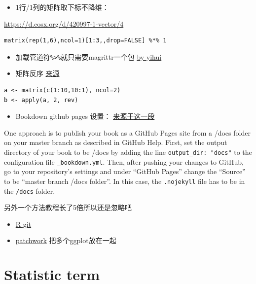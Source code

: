 \documentclass[
]{book}
\providecommand{\tightlist}{%
  \setlength{\itemsep}{0pt}\setlength{\parskip}{0pt}}
\theoremstyle{definition}
\theoremstyle{definition}
\theoremstyle{definition}
\theoremstyle{remark}
\begin{document}
\begin{itemize}
\tightlist
\item
  1行/1列的矩阵取下标不降维：
\end{itemize}

\url{https://d.cosx.org/d/420997-1-vector/4}

\begin{verbatim}
matrix(rep(1,6),ncol=1)[1:3,,drop=FALSE] %*% 1
\end{verbatim}

\begin{itemize}
\item
  加载管道符\texttt{\%\textgreater{}\%}就只需要magrittr一个包 \href{https://d.cosx.org/d/420697/7}{by yihui}
\item
  矩阵反序
  \href{https://stackoverflow.com/questions/9135799/how-to-reverse-a-matrix-in-r}{来源}
\end{itemize}

\begin{verbatim}
a <- matrix(c(1:10,10:1), ncol=2)
b <- apply(a, 2, rev)
\end{verbatim}

\begin{itemize}
\tightlist
\item
  Bookdown github pages 设置：
  \href{https://bookdown.org/yihui/bookdown/github.html}{来源于这一段}
\end{itemize}

One approach is to publish your book as a GitHub Pages site from a /docs folder on your master branch as described in GitHub Help. First, set the output directory of your book to be /docs by adding the line \texttt{output\_dir:\ "docs"} to the configuration file \texttt{\_bookdown.yml}. Then, after pushing your changes to GitHub, go to your repository's settings and under ``GitHub Pages'' change the ``Source'' to be ``master branch /docs folder''. In this case, the \texttt{.nojekyll} file has to be in the \texttt{/docs} folder.

另外一个方法教程长了5倍所以还是忽略吧

\begin{itemize}
\item
  \href{https://jennybc.github.io/2014-05-12-ubc/ubc-r/session03_git.html}{R git}
\item
  \href{https://d.cosx.org/d/421267-ggplot-patchwork}{patchwork} 把多个ggplot放在一起
\end{itemize}

\hypertarget{statistic-term}{%
\chapter{Statistic term}\label{statistic-term}}
\end{document}
